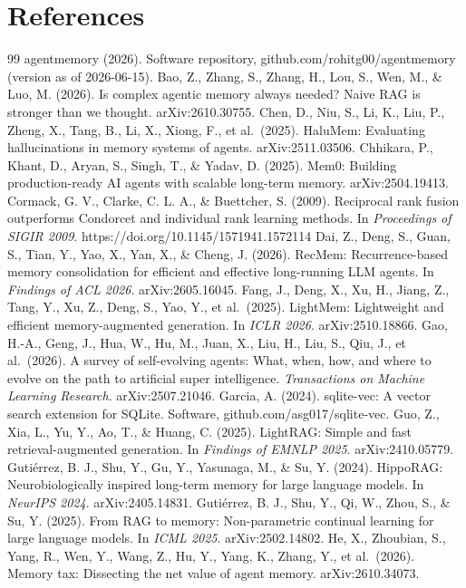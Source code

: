 \documentclass[a4paper,fleqn]{cas-sc}
\begin{document}
\section*{References}
\begin{thebibliography}{99}
\setlength{\itemsep}{2pt}
\bibitem{} agentmemory (2026). Software repository, github.com/rohitg00/agentmemory (version as of 2026-06-15).
\bibitem{} Bao, Z., Zhang, S., Zhang, H., Lou, S., Wen, M., \& Luo, M. (2026). Is complex agentic memory always needed? Naive RAG is stronger than we thought. arXiv:2610.30755.
\bibitem{} Chen, D., Niu, S., Li, K., Liu, P., Zheng, X., Tang, B., Li, X., Xiong, F., et al.~(2025). HaluMem: Evaluating hallucinations in memory systems of agents. arXiv:2511.03506.
\bibitem{} Chhikara, P., Khant, D., Aryan, S., Singh, T., \& Yadav, D. (2025). Mem0: Building production-ready AI agents with scalable long-term memory. arXiv:2504.19413.
\bibitem{} Cormack, G. V., Clarke, C. L. A., \& Buettcher, S. (2009). Reciprocal rank fusion outperforms Condorcet and individual rank learning methods. In \emph{Proceedings of SIGIR 2009}. https://doi.org/10.1145/1571941.1572114
\bibitem{} Dai, Z., Deng, S., Guan, S., Tian, Y., Yao, X., Yan, X., \& Cheng, J. (2026). RecMem: Recurrence-based memory consolidation for efficient and effective long-running LLM agents. In \emph{Findings of ACL 2026}. arXiv:2605.16045.
\bibitem{} Fang, J., Deng, X., Xu, H., Jiang, Z., Tang, Y., Xu, Z., Deng, S., Yao, Y., et al.~(2025). LightMem: Lightweight and efficient memory-augmented generation. In \emph{ICLR 2026}. arXiv:2510.18866.
\bibitem{} Gao, H.-A., Geng, J., Hua, W., Hu, M., Juan, X., Liu, H., Liu, S., Qiu, J., et al.~(2026). A survey of self-evolving agents: What, when, how, and where to evolve on the path to artificial super intelligence. \emph{Transactions on Machine Learning Research}. arXiv:2507.21046.
\bibitem{} Garcia, A. (2024). sqlite-vec: A vector search extension for SQLite. Software, github.com/asg017/sqlite-vec.
\bibitem{} Guo, Z., Xia, L., Yu, Y., Ao, T., \& Huang, C. (2025). LightRAG: Simple and fast retrieval-augmented generation. In \emph{Findings of EMNLP 2025}. arXiv:2410.05779.
\bibitem{} Gutiérrez, B. J., Shu, Y., Gu, Y., Yasunaga, M., \& Su, Y. (2024). HippoRAG: Neurobiologically inspired long-term memory for large language models. In \emph{NeurIPS 2024}. arXiv:2405.14831.
\bibitem{} Gutiérrez, B. J., Shu, Y., Qi, W., Zhou, S., \& Su, Y. (2025). From RAG to memory: Non-parametric continual learning for large language models. In \emph{ICML 2025}. arXiv:2502.14802.
\bibitem{} He, X., Zhoubian, S., Yang, R., Wen, Y., Wang, Z., Hu, Y., Yang, K., Zhang, Y., et al.~(2026). Memory tax: Dissecting the net value of agent memory. arXiv:2610.34073.

\end{thebibliography}
\end{document}
